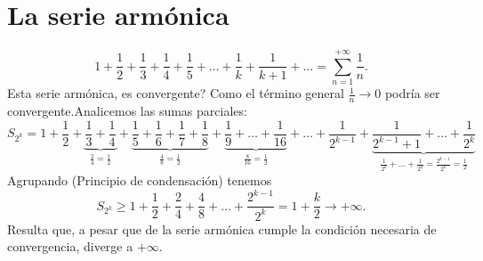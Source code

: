 \section{La serie armónica}
\begin{equation}
    1 + \frac{1}{2} + \frac{1}{3} + \frac{1}{4} + \frac{1}{5} + \ldots + \frac{1}{k} + \frac{1}{k + 1} + \ldots = \sum_{n=1}^{+\infty}\frac{1}{n}.
\end{equation}
Esta serie armónica, es convergente? Como el término general $\frac{1}{n}\rightarrow 0$ podría ser convergente.Analicemos las sumas parciales:
\begin{equation}
    S_{2^k} = 1 + \frac{1}{2} + \underbrace{\frac{1}{3} + \frac{1}{4}}_{\frac{2}{4} = \frac{1}{2}} + \underbrace{\frac{1}{5} + \frac{1}{6} + \frac{1}{7} + \frac{1}{8}}_{\frac{4}{8} = \frac{1}{2}} + \underbrace{\frac{1}{9} + \ldots + \frac{1}{16}}_{\frac{8}{16} = \frac{1}{2}} + \ldots + \frac{1}{2^{k - 1}} + \underbrace{\frac{1}{2^{k - 1} + 1} + \ldots + \frac{1}{2^k}}_{\frac{1}{2^k} + \ldots + \frac{1}{2^k} = \frac{2^{k - 1}}{2^k} = \frac{1}{2}}
\end{equation}
Agrupando (Principio de condensación) tenemos
\begin{equation}
    S_{2^k} \geq 1 + \frac{1}{2} + \frac{2}{4} + \frac{4}{8} + \ldots + \frac{2^{k - 1}}{2^k} = 1 + \frac{k}{2}\longrightarrow +\infty.
\end{equation}
Resulta que, a pesar que de la serie armónica cumple la condición necesaria de convergencia, diverge a $+\infty$.






